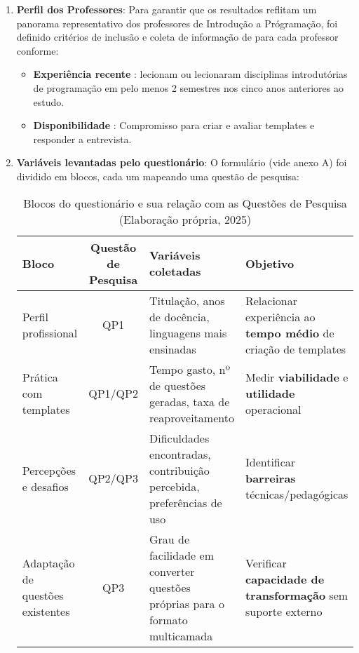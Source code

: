 \begin{enumerate}
    \item \textbf{Perfil dos Professores}:  Para garantir que os resultados reflitam um panorama representativo dos professores de Introdução a Prógramação, foi definido critérios de inclusão e coleta de informação de para cada professor conforme: 
    \begin{itemize}
        \item \textbf{Experiência recente} : lecionam ou lecionaram disciplinas introdutórias de programação em pelo menos 2 semestres nos cinco anos anteriores ao estudo. 
        \item \textbf{Disponibilidade} : Compromisso para criar e avaliar templates e responder a entrevista.
    \end{itemize}


    \item \textbf{Variáveis levantadas pelo questionário}:  O formulário (vide anexo A) foi dividido em blocos, cada um mapeando uma questão de pesquisa: 


\begin{table}[htbp]
    \centering
    \renewcommand{\arraystretch}{1.3}
    \begin{tabular}{|l|c|p{4.5cm}|p{5.5cm}|}
        \hline
        \textbf{Bloco} & \textbf{Questão de Pesquisa} & \textbf{Variáveis coletadas} & \textbf{Objetivo} \\ \hline
        Perfil profissional & QP1 & Titulação, anos de docência, linguagens mais ensinadas & Relacionar experiência ao \textbf{tempo médio} de criação de templates \\ \hline
        Prática com templates & QP1/QP2 & Tempo gasto, nº de questões geradas, taxa de reaproveitamento & Medir \textbf{viabilidade} e \textbf{utilidade} operacional \\ \hline
        Percepções e desafios & QP2/QP3 & Dificuldades encontradas, contribuição percebida, preferências de uso & Identificar \textbf{barreiras} técnicas/pedagógicas \\ \hline
        Adaptação de questões existentes & QP3 & Grau de facilidade em converter questões próprias para o formato multicamada & Verificar \textbf{capacidade de transformação} sem suporte externo \\ \hline
    \end{tabular}
    \caption{Blocos do questionário e sua relação com as Questões de Pesquisa (Elaboração própria, 2025)}
    \label{tab:questionario-qp}
\end{table}




\end{enumerate}
